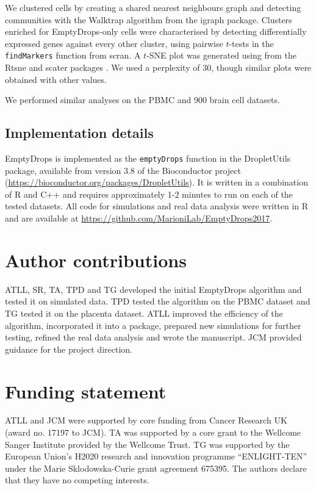 \documentclass{bmcart}
\newcommand{\code}[1]{\texttt{#1}}
\begin{document}
We clustered cells by creating a shared nearest neighbours graph \cite{xu2015identification} and detecting communities with the Walktrap algorithm from the \textsf{igraph} package.
Clusters enriched for EmptyDrops-only cells were characterised by detecting differentially expressed genes against every other cluster,
using pairwise $t$-tests in the \code{findMarkers} function from \textsf{scran}.
A $t$-SNE plot \cite{van2008visualizing} was generated using from the \textsf{Rtsne} and \textsf{scater} packages \cite{mccarthy2017scater}.
We used a perplexity of 30, though similar plots were obtained with other values.

We performed similar analyses on the PBMC and 900 brain cell datasets.

\subsection*{Implementation details}
EmptyDrops is implemented as the \code{emptyDrops} function in the \textsf{DropletUtils} package, available from version 3.8 of the Bioconductor project (\url{https://bioconductor.org/packages/DropletUtils}).
It is written in a combination of R and C++ and requires approximately 1-2 minutes to run on each of the tested datasets.
All code for simulations and real data analysis were written in R and are available at \url{https://github.com/MarioniLab/EmptyDrops2017}.

\section*{Author contributions}
ATLL, SR, TA, TPD and TG developed the initial EmptyDrops algorithm and tested it on simulated data.
TPD tested the algorithm on the PBMC dataset and TG tested it on the placenta dataset.
ATLL improved the efficiency of the algorithm, incorporated it into a package, prepared new simulations for further testing, refined the real data analysis and wrote the manuscript.
JCM provided guidance for the project direction. 

\section*{Funding statement}
ATLL and JCM were supported by core funding from Cancer Research UK (award no. 17197 to JCM).
TA was supported by a core grant to the Wellcome Sanger Institute provided by the Wellcome Trust.
TG was supported by the European Union's H2020 research and innovation programme ``ENLIGHT-TEN'' under the Marie Sklodowska-Curie grant agreement 675395.
The authors declare that they have no competing interests.
\end{document}
